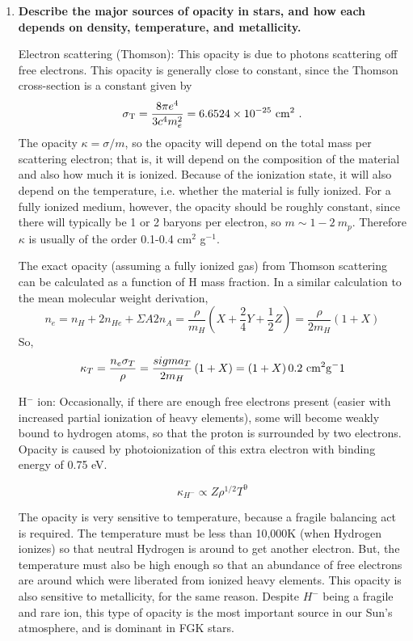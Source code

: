 \begin{enumerate}
\item \textbf{Describe the major sources of opacity in stars, and how each depends on density,
      temperature, and metallicity.}
      
      Electron scattering (Thomson): This opacity is due to photons scattering off free electrons. This opacity is generally close to constant, since the Thomson cross-section is a constant given by
      \begin{equation}
      \sigma_{\rm T} = \frac{8 \pi e^4}{3 c^4 m_e^2} = 6.6524\times 10^{-25}~{\rm cm}^2\,\, .
      \end{equation}
      The opacity $\kappa = \sigma / m$, so the opacity will depend on the total mass per scattering electron; that is, it will depend on the composition of the material and also how much it is ionized. Because of the ionization state, it will also depend on the temperature, i.e. whether the material is fully ionized. For a fully ionized medium, however, the opacity should be roughly constant, since there will typically be 1 or 2 baryons per electron, so $m \sim 1-2~m_p$. Therefore $\kappa$ is usually of the order 0.1-0.4 cm$^2$ g$^{-1}$.

      The exact opacity (assuming a fully ionized gas) from Thomson scattering can be calculated 
      as a function of H mass fraction.  In a similar calculation to the mean molecular weight 
      derivation, 
      \begin{equation}
      n_e=n_H+2n_{He}+\Sigma{A}{2}n_A=\frac{\rho}{m_H}\left(X+\frac{2}{4}Y+\frac{1}{2}Z\right)=\frac{\rho}{2m_H}\left(1+X\right)
      \end{equation}
      So,
      \begin{equation}
      \kappa_T=\frac{n_e\sigma_T}{\rho}=\frac{sigma_T}{2m_H}\left(1+X\right)=\left(1+X\right)0.2~{\rm cm^2 g^-1}
      \end{equation}
       
      H$^-$ ion: Occasionally, if there are enough free electrons present (easier with increased partial ionization of heavy elements), some will become weakly bound to hydrogen atoms, so that the proton is surrounded by two electrons. Opacity is caused by photoionization of this extra electron with binding energy of 0.75 eV. 
      
      \begin{equation}
      \kappa_{H^{-}} \propto Z \rho^{1/2} T^{9}
      \end{equation}
      
      The opacity is very sensitive to temperature, because a fragile balancing act is required. The temperature must be less than 10,000K (when Hydrogen ionizes) so that neutral Hydrogen is around to get another electron. But, the temperature must also be high enough so that an abundance of free electrons are around which were liberated from ionized heavy elements. This opacity is also sensitive to metallicity, for the same reason. 
      Despite $H^{-}$ being a fragile and rare ion, this type of opacity is the most important source in our Sun's atmosphere, and is dominant in FGK stars.


\end{enumerate}
